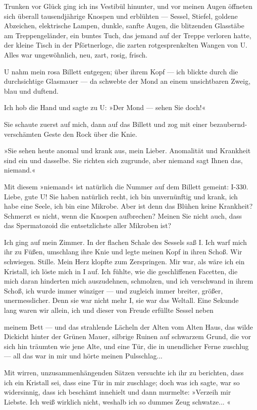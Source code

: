 Trunken vor Glück ging ich ins Vestibül hinunter, und vor meinen
Augen öffneten sich überall tausendjährige Knospen und erblühten —
Sessel, Stiefel, goldene Abzeichen, elektrische Lampen, dunkle,
sanfte Augen, die blitzenden Glasstäbe am Treppengeländer, ein
buntes Tuch, das jemand auf der Treppe verloren hatte, der kleine
Tisch in der Pförtnerloge, die zarten rotgesprenkelten Wangen von
U. Alles war ungewöhnlich, neu, zart, rosig, frisch.

U nahm mein rosa Billett entgegen; über ihrem Kopf — ich blickte
durch die durchsichtige Glasmauer — da schwebte der Mond an einem
unsichtbaren Zweig, blau und duftend.

Ich hob die Hand und sagte zu U: »Der Mond — sehen Sie doch!«

Sie schaute zuerst auf mich, dann auf das Billett und zog mit einer
bezaubernd-verschämten Geste den Rock über die Knie.

»Sie sehen heute anomal und krank aus, mein Lieber. Anomalität und
Krankheit sind ein und dasselbe. Sie richten sich zugrunde, aber
niemand sagt Ihnen das, niemand.«

Mit diesem »niemand« ist natürlich die Nummer auf dem Billett
gemeint: I-330. Liebe, gute U! Sie haben natürlich recht, ich bin
unvernünftig und krank, ich habe eine Seele, ich bin eine Mikrobe.
Aber ist denn das Blühen keine Krankheit? Schmerzt es nicht, wenn
die Knospen aufbrechen? Meinen Sie nicht auch, dass das
Spermatozoid die entsetzlichste aller Mikroben ist?

Ich ging auf mein Zimmer. In der flachen Schale des Sessels saß I.
Ich warf mich ihr zu Füßen, umschlang ihre Knie und legte meinen
Kopf in ihren Schoß. Wir schwiegen. Stille. Mein Herz klopfte zum
Zerspringen. Mir war, als wäre ich ein Kristall, ich löste mich in
I auf. Ich fühlte, wie die geschliffenen Facetten, die mich daran
hinderten mich auszudehnen, schmolzen, und ich verschwand in ihrem
Schoß, ich wurde immer winziger — und zugleich immer breiter,
größer, unermesslicher. Denn sie war nicht mehr I, sie war das
Weltall. Eine Sekunde lang waren wir allein, ich und dieser von
Freude erfüllte Sessel neben

meinem Bett — und das strahlende Lächeln der Alten vom Alten Haus,
das wilde Dickicht hinter der Grünen Mauer, silbrige Ruinen auf
schwarzem Grund, die vor sich hin träumten wie jene Alte, und eine
Tür, die in unendlicher Ferne zuschlug — all das war in mir und
hörte meinen Pulsschlag...

Mit wirren, unzusammenhängenden Sätzen versuchte ich ihr zu
berichten, dass ich ein Kristall sei, dass eine Tür in mir
zuschlage; doch was ich sagte, war so widersinnig, dass ich
beschämt innehielt und dann murmelte: »Verzeih mir Liebste. Ich
weiß wirklich nicht, weshalb ich so dummes Zeug schwatze... «


